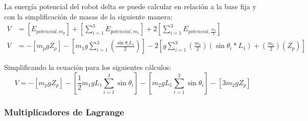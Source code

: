                 La energía potencial del robot delta se puede calcular en relación a la base fija y con la simplificación de masas de la siguiente manera:
                \begin{align*}
                     V&= \left[ E_{potencial,  m_{p} } \right] + \left[  \sum _{i=1}^{3}E_{potencial, m_{1} } \right]  +2 \left[  \sum _{i=1}^{3}E_{potencial, \frac{m_{2}}{2} } \right]  \\
                     V&=- \left[ m_{p}gZ_{p} \right] - \left[ m_{1}g \sum _{i=1}^{3} \left( \frac{\sin  \theta _{i} L_{1}}{2} \right)  \right] -2 \left[ g \sum _{i=1}^{3} \left( \frac{m_{2}}{2} \right)  \left( \sin  \theta _{i}\ast L_{1} \right) + \left( \frac{m_{2}}{2} \right)  \left( Z_{p} \right)  \right]
                \end{align*}

                Simplificando la ecuación para los siguientes cálculos: 
                \begin{equation}
                     V=- \left[ m_{p}gZ_{p} \right] - \left[ \frac{1}{2}m_{1}gL_{1} \sum _{i=1}^{3}\sin  \theta _{i} \right] - \left[ m_{2}gL_{1} \sum _{i=1}^{3}\sin  \theta _{i} \right] - \left[ 3m_{2}gZ_{p} \right]
                \end{equation}
                
         \newpage

            \subsubsection{Multiplicadores de Lagrange}
            
